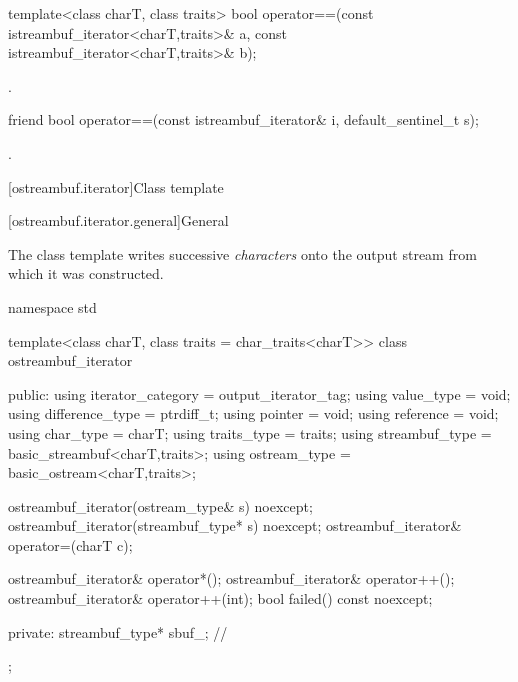 %
\begin{itemdecl}
template<class charT, class traits>
  bool operator==(const istreambuf_iterator<charT,traits>& a,
                  const istreambuf_iterator<charT,traits>& b);
\end{itemdecl}

\begin{itemdescr}
\pnum
\returns
{}.
\end{itemdescr}

%
\begin{itemdecl}
friend bool operator==(const istreambuf_iterator& i, default_sentinel_t s);
\end{itemdecl}

\begin{itemdescr}
\pnum
\returns
{}.
\end{itemdescr}

[ostreambuf.iterator]{Class template }

[ostreambuf.iterator.general]{General}

\pnum
The class template 
writes successive \textit{characters} onto the output stream
from which it was constructed.

%
\begin{codeblock}
namespace std {
  template<class charT, class traits = char_traits<charT>>
  class ostreambuf_iterator {
  public:
    using iterator_category = output_iterator_tag;
    using value_type        = void;
    using difference_type   = ptrdiff_t;
    using pointer           = void;
    using reference         = void;
    using char_type         = charT;
    using traits_type       = traits;
    using streambuf_type    = basic_streambuf<charT,traits>;
    using ostream_type      = basic_ostream<charT,traits>;

    ostreambuf_iterator(ostream_type& s) noexcept;
    ostreambuf_iterator(streambuf_type* s) noexcept;
    ostreambuf_iterator& operator=(charT c);

    ostreambuf_iterator& operator*();
    ostreambuf_iterator& operator++();
    ostreambuf_iterator& operator++(int);
    bool failed() const noexcept;

  private:
    streambuf_type* sbuf_;              // \expos
  };
}
\end{codeblock}

